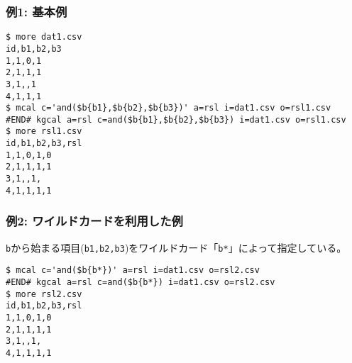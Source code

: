 \subsubsection*{例1: 基本例}



\begin{Verbatim}[baselinestretch=0.7,frame=single]
$ more dat1.csv
id,b1,b2,b3
1,1,0,1
2,1,1,1
3,1,,1
4,1,1,1
$ mcal c='and($b{b1},$b{b2},$b{b3})' a=rsl i=dat1.csv o=rsl1.csv
#END# kgcal a=rsl c=and($b{b1},$b{b2},$b{b3}) i=dat1.csv o=rsl1.csv
$ more rsl1.csv
id,b1,b2,b3,rsl
1,1,0,1,0
2,1,1,1,1
3,1,,1,
4,1,1,1,1
\end{Verbatim}
\subsubsection*{例2: ワイルドカードを利用した例}

\verb|b|から始まる項目(\verb|b1,b2,b3|)をワイルドカード「\verb|b*|」によって指定している。


\begin{Verbatim}[baselinestretch=0.7,frame=single]
$ mcal c='and($b{b*})' a=rsl i=dat1.csv o=rsl2.csv
#END# kgcal a=rsl c=and($b{b*}) i=dat1.csv o=rsl2.csv
$ more rsl2.csv
id,b1,b2,b3,rsl
1,1,0,1,0
2,1,1,1,1
3,1,,1,
4,1,1,1,1
\end{Verbatim}
